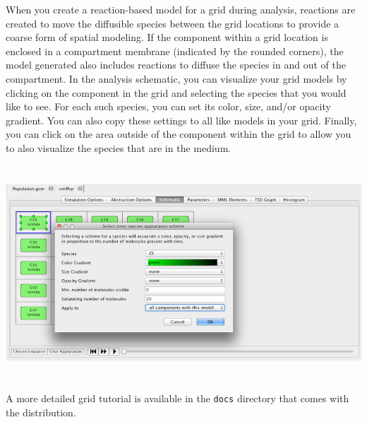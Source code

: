\documentclass[titlepage,11pt]{article}
\begin{document}
When you create a reaction-based model for a grid during analysis, reactions are created to move the diffusible species between the grid locations to provide a coarse form of spatial modeling.  If the component within a grid location is enclosed in a compartment membrane (indicated by the rounded corners), the model generated also includes reactions to diffuse the species in and out of the compartment.  In the analysis schematic, you can visualize your grid models by clicking on the component in the grid and selecting the species that you would like to see.  For each such species, you can set its color, size, and/or opacity gradient.  You can also copy these settings to all like models in your grid.  Finally, you can click on the area outside of the component within the grid to allow you to also visualize the species that are in the medium.

\begin{center}
\includegraphics[height=80mm]{screenshots/compAppearances}
\end{center}

\noindent
A more detailed 
grid tutorial
is available in the {\tt docs} directory that comes with the distribution.
\end{document}
